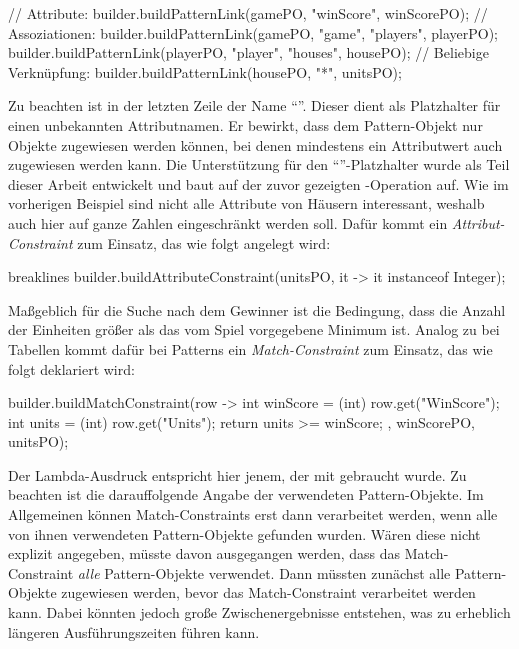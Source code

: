 \begin{jcodeblock}
    // Attribute:
    builder.buildPatternLink(gamePO, "winScore", winScorePO);
    // Assoziationen:
    builder.buildPatternLink(gamePO, "game", "players", playerPO);
    builder.buildPatternLink(playerPO, "player", "houses", housePO);
    // Beliebige Verknüpfung:
    builder.buildPatternLink(housePO, "*", unitsPO);
\end{jcodeblock}

Zu beachten ist in der letzten Zeile der Name ``\code{*}''.
Dieser dient als Platzhalter für einen unbekannten Attributnamen.
Er bewirkt, dass dem Pattern-Objekt  nur Objekte zugewiesen werden können, bei denen mindestens ein Attributwert auch  zugewiesen werden kann.
Die Unterstützung für den  ``\code{*}''-Platzhalter wurde als Teil dieser Arbeit entwickelt und baut auf der zuvor gezeigten -Operation auf.
Wie im vorherigen Beispiel sind nicht alle Attribute von Häusern interessant, weshalb auch hier auf ganze Zahlen eingeschränkt werden soll.
Dafür kommt ein \emph{Attribut-Constraint} zum Einsatz, das wie folgt angelegt wird:

\begin{jcodeblock*}{breaklines}
    builder.buildAttributeConstraint(unitsPO, it -> it instanceof Integer);
\end{jcodeblock*}

Maßgeblich für die Suche nach dem Gewinner ist die Bedingung, dass die Anzahl der Einheiten größer als das vom Spiel vorgegebene Minimum ist.
Analog zu  bei Tabellen kommt dafür bei Patterns ein \emph{Match-Constraint} zum Einsatz, das wie folgt deklariert wird:

\begin{jcodeblock}
    builder.buildMatchConstraint(row -> {
        int winScore = (int) row.get("WinScore");
        int units = (int) row.get("Units");
        return units >= winScore;
    }, winScorePO, unitsPO);
\end{jcodeblock}

Der Lambda-Ausdruck entspricht hier jenem, der mit  gebraucht wurde.
Zu beachten ist die darauffolgende Angabe der verwendeten Pattern-Objekte.
Im Allgemeinen können Match-Constraints erst dann verarbeitet werden, wenn alle von ihnen verwendeten Pattern-Objekte gefunden wurden.
Wären diese nicht explizit angegeben, müsste davon ausgegangen werden, dass das Match-Constraint \emph{alle} Pattern-Objekte verwendet.
Dann müssten zunächst alle Pattern-Objekte zugewiesen werden, bevor das Match-Constraint verarbeitet werden kann.
Dabei könnten jedoch große Zwischenergebnisse entstehen, was zu erheblich längeren Ausführungszeiten führen kann.

